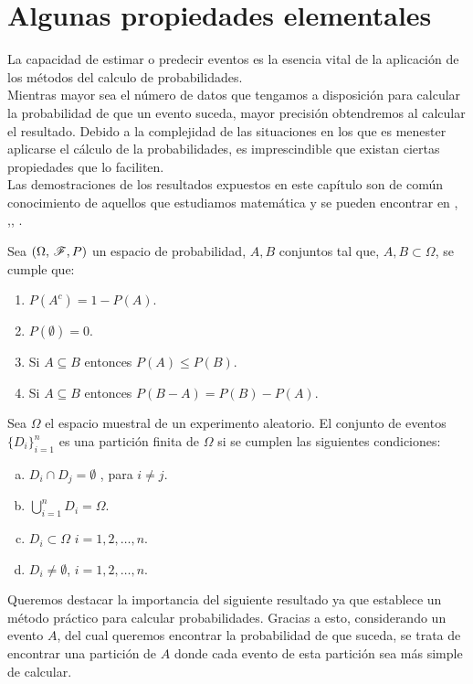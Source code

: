 \section{Algunas propiedades elementales}
La capacidad de estimar o predecir eventos es la esencia vital de la aplicación de los métodos del calculo de probabilidades.\\
Mientras mayor sea el número de datos que tengamos a disposición para calcular la probabilidad de que un evento suceda, mayor precisión obtendremos al calcular el resultado. Debido a la complejidad de las situaciones en los que es menester aplicarse el cálculo de la probabilidades, es imprescindible que existan ciertas propiedades que lo faciliten.\\
Las demostraciones de los resultados expuestos en este capítulo son de común conocimiento de aquellos que estudiamos matemática y se pueden encontrar en \cite{intro-probabilidad}, \cite{Feller},\cite{Rincon1}, \cite{Rincon2}.
\begin{Prop}
    Sea $(\Omega,\thinspace\mathscr{F},P)$ un espacio de probabilidad, $A,B$ conjuntos tal que, $A,B\subset\Omega$, se cumple que:
    \begin{enumerate}
        \item $P(A^c)=1-P(A)$.
        \item $P(\emptyset)=0$.
        \item Si $A\subseteq B$ entonces $P(A)\leq P(B)$.
        \item Si $A\subseteq B$ entonces $P(B-A)=P(B)-P(A)$.
    \end{enumerate}
\end{Prop}
\begin{Def}
    Sea $\Omega$ el espacio muestral de un experimento aleatorio. El conjunto de eventos $\{D_i\}^{n}_{i=1}$ es una partición finita de $\Omega$ si se cumplen las siguientes condiciones:
    \begin{enumerate}[a)]
        \item $D_i\cap D_j=\emptyset$ , para $i\not= j$.
        \item $\bigcup_{i=1}^n D_i=\Omega$.
        \item $D_i\subset\Omega$ $i=1,2,\ldots,n$.
        \item $D_i\not=\emptyset$, $i=1,2,\ldots,n$.
    \end{enumerate}
\end{Def}
Queremos destacar la importancia del siguiente resultado ya que establece un método práctico para calcular probabilidades. Gracias a esto, considerando un evento $A$, del cual queremos encontrar la probabilidad de que suceda, se trata de encontrar una partición de $A$ donde cada evento de esta partición sea más simple de calcular.
